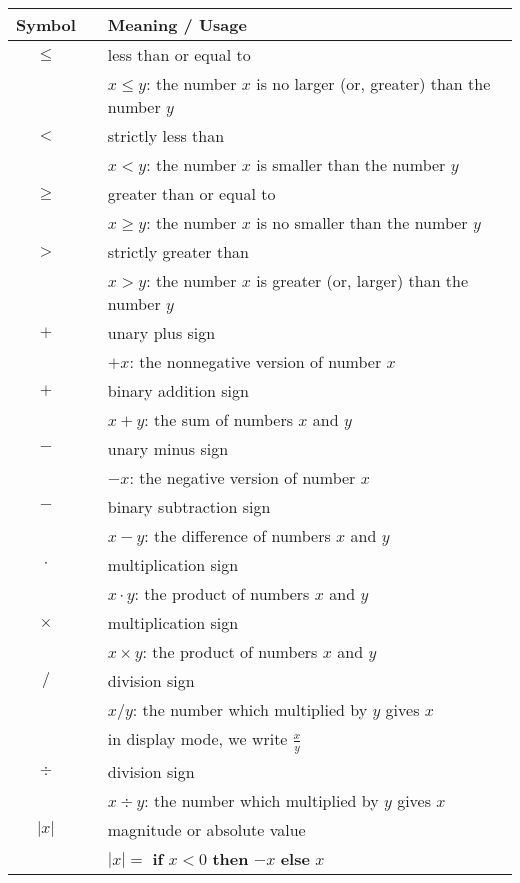 \begin{tabular}{c|cl}
{\bf Symbol} & & {\bf Meaning} / {\bf Usage} \\ \hline
\hline
$\leq$
  & & less than or equal to  \\
  & & $x \leq y$: the number $x$ is no larger (or, greater) than the number $y$ \\ \hline
$<$
  & & strictly less than  \\
  & & $x < y$: the number $x$ is smaller than the number $y$ \\ \hline
$\geq$
  & & greater than or equal to  \\
  & & $x \geq y$: the number $x$ is no smaller than the number $y$ \\ \hline
$>$
  & & strictly greater than  \\
  & & $x > y$: the number $x$ is greater (or, larger) than the number $y$ \\ \hline
$+$
  & & unary plus sign \\
  & & $+x$: the nonnegative version of number $x$ \\ \hline
$+$
  & & binary addition sign \\
  & & $x+y$: the sum of numbers $x$ and $y$ \\ \hline
$-$
  & & unary minus sign \\
  & & $-x$: the negative version of number $x$ \\ \hline
$-$
  & & binary subtraction sign \\
  & & $x-y$: the difference of numbers $x$ and $y$ \\ \hline
$\cdot$
  & & multiplication sign \\
  & & $x \cdot y$: the product of numbers $x$ and $y$ \\
$\times$
  & & multiplication sign \\
  & & $x \times y$: the product of numbers $x$ and $y$ \\ \hline
$/$
  & & division sign \\
  & & $x / y$: the number which multiplied by $y$ gives $x$ \\
  & & in display mode, we write $\displaystyle \frac{x}{y}$ \\
$\div$
  & & division sign \\
  & & $x \div y$: the number which multiplied by $y$ gives $x$ \\ \hline
$|x|$
  & & magnitude or absolute value \\
  & & $|x| =$ {\bf if} $x<0$ {\bf then} $-x$ {\bf else} $x$ \\ \hline

\end{tabular}
